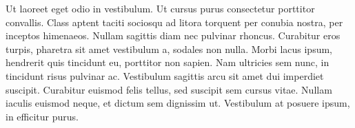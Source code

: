 Ut laoreet eget odio in vestibulum. Ut cursus purus consectetur porttitor convallis. Class aptent taciti sociosqu ad litora torquent per conubia nostra, per inceptos himenaeos. Nullam sagittis diam nec pulvinar rhoncus. Curabitur eros turpis, pharetra sit amet vestibulum a, sodales non nulla. Morbi lacus ipsum, hendrerit quis tincidunt eu, porttitor non sapien. Nam ultricies sem nunc, in tincidunt risus pulvinar ac. Vestibulum sagittis arcu sit amet dui imperdiet suscipit. Curabitur euismod felis tellus, sed suscipit sem cursus vitae. Nullam iaculis euismod neque, et dictum sem dignissim ut. Vestibulum at posuere ipsum, in efficitur purus.
